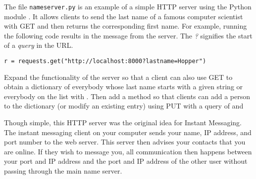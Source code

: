 \begin{problem}
The file \texttt{nameserver.py} is an example of a simple HTTP server using the Python module .
It allows clients to send the last name of a famous computer scientist with GET and then returns the corresponding first name.
For example, running the following code results in the message  from the server.
The \emph{?} signifies the start of a \emph{query} in the URL.

\begin{lstlisting}
r = requests.get("http://localhost:8000?lastname=Hopper")
\end{lstlisting}

Expand the functionality of the server so that a client can also use GET to obtain a dictionary of everybody whose last name starts with a given string or everybody on the list with .
Then add a method so that clients can add a person to the dictionary (or modify an existing entry) using PUT with a query of  and 
\end{problem}

Though simple, this HTTP server was the original idea for Instant Messaging.
The instant messaging client on your computer sends your name, IP address, and port number to the web server.
This server then advises your contacts that you are online.
If they wish to message you, all communication then happens between your port and IP address and the port and IP address of the other user without passing through the main name server.

